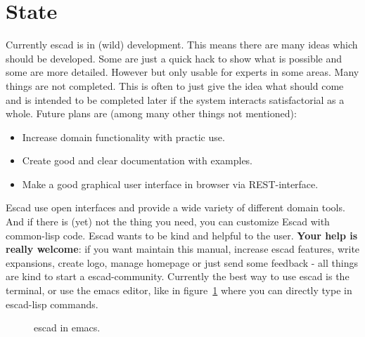 \documentclass[a4paper, 12pt, openany]{scrbook}
\begin{document}
\section{State}
Currently escad is in (wild) development. This means there are many ideas which should be developed. Some are just a quick hack to show what is possible and some are more detailed. However but only usable for experts in some areas. Many things are not completed. This is often to just give the idea what should come and is intended to be completed later if the system interacts satisfactorial as a whole.
Future plans are (among many other things not mentioned):
\begin{itemize}
\item Increase domain functionality with practic use.
\item Create good and clear documentation with examples.
\item Make a good graphical user interface in browser via REST-interface.
\end{itemize}
Escad use open interfaces and provide a wide variety of different domain tools. And if there is (yet) not the thing you need, you can customize Escad with common-lisp code. Escad wants to be kind and helpful to the user. \textbf{Your help is really welcome}: if you want maintain this manual, increase escad features, write expansions, create logo, manage homepage or just send some feedback - all things are kind to start a escad-community. Currently the best way to use escad is the terminal, or use the emacs editor, like in figure~\ref{fig:escad_emacs} where you can directly type in escad-lisp commands.
\begin{figure}[htbp]
  \centering
  \caption{escad in emacs.}
  \label{fig:escad_emacs}
\end{figure}
\end{document}
